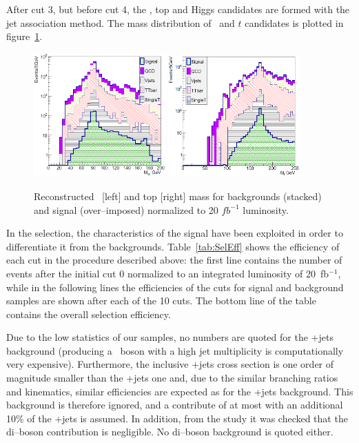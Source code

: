 After cut 3, but before cut 4, the \W, top and Higgs candidates are formed with the jet association method. The mass distribution of \W~and $t$ candidates is plotted in figure~\ref{fig:MWMTop}.

\begin{figure}[!Hhtbp]
  \begin{center}
    \includegraphics[width=0.45\textwidth]{figs/Pheno/MW.png}
    \includegraphics[width=0.45\textwidth]{figs/Pheno/Mtop.png}
    \caption{Reconstructed \W~[left] and top [right] mass for backgrounds (stacked) and signal (over--imposed) normalized to 20 $fb^{-1}$ luminosity.}
    \label{fig:MWMTop}
  \end{center}
\end{figure}

In the selection, the characteristics of the signal have been exploited in order to differentiate it from the backgrounds. Table~\ref{tab:SelEff} shows the efficiency of each cut in the procedure described above: the first line contains the number of events after the initial cut 0 normalized to an integrated luminosity of 20~fb$^{-1}$, while in the following lines the efficiencies of the cuts for signal and background samples are shown after each of the 10 cuts. The bottom line of the table contains the overall selection efficiency. 

Due to the low statistics of our samples, no numbers are quoted for the \Z+jets background (producing a \Z~boson with a high jet multiplicity is computationally very expensive). Furthermore, the inclusive \Z+jets cross section is one order of magnitude smaller than the \W+jets one and, due to the similar branching ratios and kinematics, similar efficiencies are expected as for the \W+jets background. This background is therefore ignored, and a contribute of at most with an additional 10\% of the \W+jets is assumed. In addition, from the study it was checked that the di--boson contribution is negligible. No di--boson background is quoted either.

